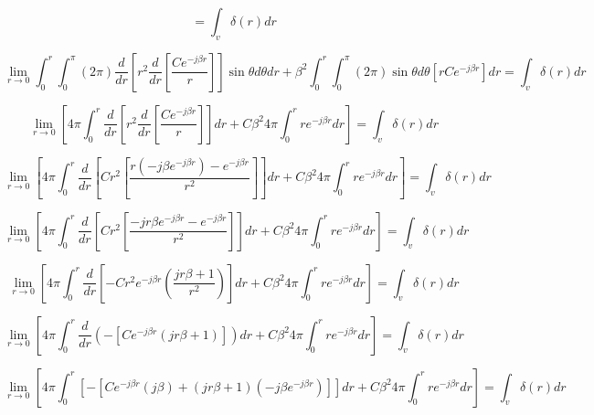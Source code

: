 	$$= \int_{v}\delta(r)dr$$
	
	\begin{dmath*}
		\lim\limits_{r\rightarrow0} \int_{0}^{r} \int_{0}^{\pi}(2\pi)\frac{d}{dr}\left[{r^{2}}\frac{d}{dr}\left[\frac{Ce^{-j\beta r}}{r}\right]\right]\sin\theta d\theta dr + \beta^{2} \int_{0}^{r} \int_{0}^{\pi}(2\pi)\sin\theta d\theta[rCe^{-j\beta r}]dr = \int_{v}\delta(r)dr
	\end{dmath*}
	
	\begin{dmath*}
		\lim\limits_{r\rightarrow0} \left[4\pi\int_{0}^{r}\frac{d}{dr}\left[{r^{2}}\frac{d}{dr}\left[\frac{Ce^{-j\beta r}}{r}\right]\right]dr + C\beta^{2}4\pi\int_{0}^{r}re^{-j\beta r}dr\right] = \int_{v}\delta(r)dr
	\end{dmath*}

	\begin{dmath*}
		\lim\limits_{r\rightarrow0} \left[4\pi\int_{0}^{r}\frac{d}{dr}\left[{Cr^{2}}\left[\frac{r(-j\beta e^{-j\beta r}) - e^{-j\beta r}}{r^{2}}\right]\right]dr + C\beta^{2}4\pi\int_{0}^{r}re^{-j\beta r}dr\right] = \int_{v}\delta(r)dr
	\end{dmath*}
	
	\begin{dmath*}
		\lim\limits_{r\rightarrow0} \left[4\pi\int_{0}^{r}\frac{d}{dr}\left[{Cr^{2}}\left[\frac{-jr\beta e^{-j\beta r} - e^{-j\beta r}}{r^{2}}\right]\right]dr + C\beta^{2}4\pi\int_{0}^{r}re^{-j\beta r}dr\right] = \int_{v}\delta(r)dr
	\end{dmath*}
	
	\begin{dmath*}
		\lim\limits_{r\rightarrow0} \left[4\pi\int_{0}^{r}\frac{d}{dr}\left[{-Cr^{2}} e^{-j\beta r}\left(\frac{jr\beta+1}{r^{2}}\right)\right]dr + C\beta^{2}4\pi\int_{0}^{r}re^{-j\beta r}dr\right] = \int_{v}\delta(r)dr
	\end{dmath*}
	
	\begin{dmath*}
		\lim\limits_{r\rightarrow0} \left[4\pi\int_{0}^{r}\frac{d}{dr}\left(-[{C} e^{-j\beta r}(jr\beta+1)]\right)dr + C\beta^{2}4\pi\int_{0}^{r}re^{-j\beta r}dr\right] = \int_{v}\delta(r)dr
	\end{dmath*}

	\begin{dmath*}
		\lim\limits_{r\rightarrow0} \left[4\pi\int_{0}^{r}\left[-[{C} e^{-j\beta r}(j\beta) + (jr\beta+1)(-j\beta e^{-j\beta r})]\right]dr + C\beta^{2}4\pi\int_{0}^{r}re^{-j\beta r}dr\right] = \int_{v}\delta(r)dr
	\end{dmath*}
	

